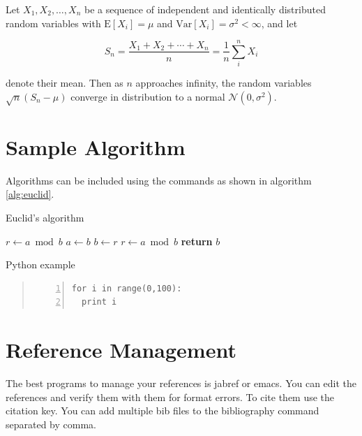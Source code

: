 \documentclass[9pt,twocolumn,twoside]{styles/osajnl}
\begin{document}
Let $X_1, X_2, \ldots, X_n$ be a sequence of independent and
identically distributed random variables with $\text{E}[X_i] = \mu$
and $\text{Var}[X_i] = \sigma^2 < \infty$, and let

\begin{equation}
S_n = \frac{X_1 + X_2 + \cdots + X_n}{n}
      = \frac{1}{n}\sum_{i}^{n} X_i
\label{eq:refname1}
\end{equation}

denote their mean. Then as $n$ approaches infinity, the random
variables $\sqrt{n}(S_n - \mu)$ converge in distribution to a normal
$\mathcal{N}(0, \sigma^2)$. 

\section{Sample Algorithm}

Algorithms can be included using the commands as shown in algorithm
\ref{alg:euclid}.

\begin{algorithm}
\caption{Euclid’s algorithm}\label{alg:euclid}
\begin{algorithmic}[1]
\State $r\gets a\bmod b$
\State $a\gets b$
\State $b\gets r$
\State $r\gets a\bmod b$
\EndWhile\label{euclidendwhile}
\State \textbf{return} $b$
\EndProcedure
\end{algorithmic}
\end{algorithm}

\begin{algorithm}
\caption{Python example}\label{alg:python}
\begin{quote}
\begin{Verbatim}[numbers=left]
for i in range(0,100):
  print i
\end{Verbatim}
\end{quote}
\end{algorithm}

\section{Reference Management}

The best programs to manage your references is jabref or emacs. You
can edit the references and verify them with them for format
errors. To cite them use the citation key. You can add multiple bib
files to the bibliography command separated by comma.
\end{document}
